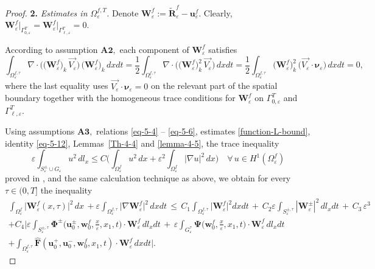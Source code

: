 \documentclass[reqno]{amsart}            %
\numberwithin{equation}{section}
\begin{document}
\begin{proof}
		\noindent
		\textbf{2.} \emph{Estimates in $\Omega_\varepsilon^{f, T}$.}
		Denote $\mathbf{W}^f_\varepsilon := \widetilde{\mathbf{R}}^f_\varepsilon - \mathbf{u}^f_\varepsilon.$ Clearly, 
		$\mathbf{W}^f_\varepsilon\big|_{\Gamma^T_{0,\varepsilon}} =  \mathbf{W}^f_\varepsilon \big|_{\Gamma^T_{\ell,\varepsilon}} = 0.$
		
		According to assumption $\mathbf{A2},$ each component of $\mathbf{W}^f_\varepsilon$ satisfies
		\begin{equation}\label{eq-5-12}
			\int_{\Omega_\varepsilon^{f, \tau}} \nabla \cdot \big(\big(\mathbf{W}^f_\varepsilon\big)_k \, \overrightarrow{V_\varepsilon}\big)\,
			\big(\mathbf{W}^f_\varepsilon\big)_k \, dxdt = \frac12 \int_{\Omega_\varepsilon^{f, \tau}} \nabla \cdot \big( \big(\mathbf{W}^f_\varepsilon\big)^2_k \, \overrightarrow{V_\varepsilon}\big) \, dxdt =
			\frac12 \int_{\Omega_\varepsilon^{f, \tau}} \big(\mathbf{W}^f_\varepsilon\big)^2_k \,  \big(\overrightarrow{V_\varepsilon}\cdot \boldsymbol{\nu}_\varepsilon \big) \, dxdt = 0,
		\end{equation} 	
		where the last equality uses \(\overrightarrow{V_\varepsilon}\cdot\boldsymbol{\nu}_\varepsilon=0\) on the relevant part of the spatial boundary together with the homogeneous trace conditions for \(\mathbf{W}^f_\varepsilon\) on $\Gamma^T_{0,\varepsilon}$ and $\Gamma^T_{\ell,\varepsilon}.$ 
		
		
		Using assumptions $\mathbf{A3},$ relations \eqref{eq-5-4} -- \eqref{eq-5-6},  estimates \eqref{function-L-bound}, identity \eqref{eq-5-12}, Lemmas~\ref{Th-4-4} and \ref{lemma-4-5}, the trace inequality
		\begin{equation}\label{trace-1}
			\varepsilon \int_{S^\pm_\varepsilon \cup G_\varepsilon} u^2 \, dl_x \le C\Big(\int_{\Omega_\varepsilon^f} u^2\, dx + \varepsilon^2 \int_{\Omega_\varepsilon^f} |\nabla u|^2\, dx\Big) \quad \forall \, u\in H^1(\Omega_\varepsilon^f)	
		\end{equation}
		proved in \cite{Melnyk-Popov-2009},
		and
		the same calculation technique as above, we obtain for every \(\tau\in(0,T]\) the inequality   
		\begin{multline}\label{eq-5-14}
			\int_{\Omega_\varepsilon^f} \big|\mathbf{W}^f_\varepsilon(x,\tau)\big|^2 \, dx\,  + \varepsilon \int_{\Omega_\varepsilon^{f, \tau}} \big|\nabla \mathbf{W}^f_\varepsilon\big|^2 \, dxdt \, \le \, C_1\int_{\Omega_\varepsilon^{f, \tau}} \big|\mathbf{W}^f_\varepsilon\big|^2  dxdt \, + \, C_2 \varepsilon \int_{S_\varepsilon^{\pm, \tau}} |\mathbf{W}^\pm_\varepsilon|^2 \, dl_xdt \, +\,   C_3 \, \varepsilon^3
			\\	
			+ C_4 \Bigg|\varepsilon \int_{S_\varepsilon^{\pm, \tau}} \mathbf{\Phi}^\pm\big(\mathbf{u}^\pm_0, \mathbf{w}^f_0, \tfrac{x}{\varepsilon}, x_1, t\big) \cdot \mathbf{W}^f_\varepsilon \, dl_xdt \,+\,
			\varepsilon \int_{G_\varepsilon^{\tau}} \mathbf{\Psi}\big(\mathbf{w}^f_0, \tfrac{x}{\varepsilon}, x_1, t\big) \cdot \mathbf{W}^f_\varepsilon \, dl_xdt	
			\\
			+ \int_{\Omega_\varepsilon^{f, \tau}} \widehat{\mathbf{F}}(\mathbf{u}^+_0, \mathbf{u}^-_0, \mathbf{w}^f_0, x_1, t) \cdot \mathbf{W}^f_\varepsilon \, dxdt\Bigg|. 
		\end{multline}
		

\end{proof}
\end{document}
